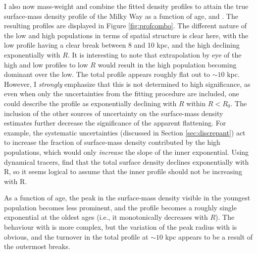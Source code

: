 I also now mass-weight and combine the fitted density profiles to attain the true surface-mass density profile of the Milky Way as a function of age, \feh{} and \afe{}. The resulting profiles are displayed in Figure \ref{fig:profcombo}. The different nature of the low and high \afe{} populations in terms of spatial structure is clear here, with the low \afe{} profile having a clear break between 8 and 10 kpc, and the high \afe{} declining exponentially with $R$. It is interesting to note that extrapolation by eye of the high and low \afe{} profiles to low $R$ would result in the high \afe{} population becoming dominant over the low. The total profile appears roughly flat out to $\sim 10$ kpc. However, I \emph{strongly} emphasize that this is not determined to high significance, as even when only the uncertainties from the fitting procedure are included, one could describe the profile as exponentially declining with $R$ within $R < R_0$. The inclusion of the other sources of uncertainty on the surface-mass density estimates further decrease the significance of the apparent flattening. For example, the systematic uncertainties (discussed in Section \ref{sec:discrepant}) act to increase the fraction of surface-mass density contributed by the high \afe{} populations, which would only \emph{increase} the slope of the inner exponential. Using dynamical tracers, \citet{2013ApJ...779..115B} find that the total surface density declines exponentially with R, so it seems logical to assume that the inner profile should not be increasing with R.

As a function of age, the peak in the surface-mass density visible in the youngest population becomes less prominent, and the profile becomes a roughly single exponential at the oldest ages (i.e., it monotonically decreases with $R$).  The behaviour with \feh{} is more complex, but the variation of the peak radius with \feh{} is obvious, and the turnover in the total profile at $\sim 10$ kpc appears to be a result of the outermost breaks.

